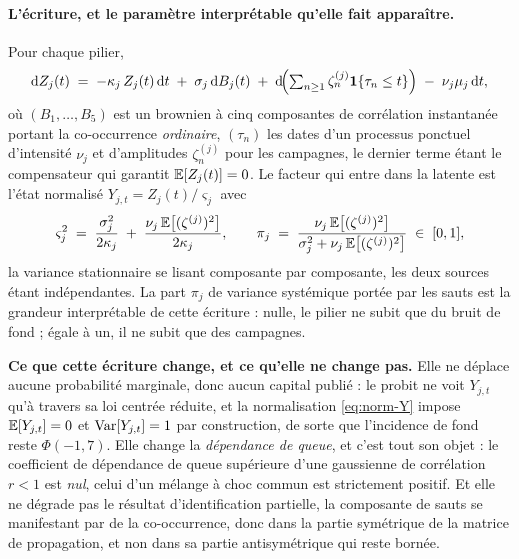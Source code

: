 \paragraph{L'écriture, et le paramètre interprétable qu'elle fait apparaître.}
Pour chaque pilier,
\begin{equation}
  \mathrm{d}Z_j(t) \;=\; -\kappa_j\,Z_j(t)\,\mathrm{d}t \;+\; \sigma_j\,\mathrm{d}B_j(t)
  \;+\; \mathrm{d}\!\Bigl(\textstyle\sum_{n\ge 1}\zeta^{(j)}_n\mathbf 1\{\tau_n\le t\}\Bigr)
  \;-\; \nu_j\mu_j\,\mathrm{d}t,
  \label{eq:sde-Y}
\end{equation}
où $(B_1,\dots,B_5)$ est un brownien à cinq composantes de corrélation instantanée portant la
co-occurrence \emph{ordinaire}, $(\tau_n)$ les dates d'un processus ponctuel d'intensité $\nu_j$
et d'amplitudes $\zeta^{(j)}_n$ pour les campagnes, le dernier terme étant le compensateur qui
garantit $\mathbb{E}[Z_j(t)]=0$. Le facteur qui entre dans la latente est l'état normalisé
$Y_{j,t}=Z_j(t)/\varsigma_j$ avec
\begin{equation}
  \varsigma_j^2 \;=\; \frac{\sigma_j^2}{2\kappa_j} \;+\;
  \frac{\nu_j\,\mathbb{E}\bigl[(\zeta^{(j)})^2\bigr]}{2\kappa_j},
  \qquad
  \pi_j \;=\; \frac{\nu_j\,\mathbb{E}\bigl[(\zeta^{(j)})^2\bigr]}
                   {\sigma_j^2+\nu_j\,\mathbb{E}\bigl[(\zeta^{(j)})^2\bigr]} \;\in\; [0,1],
  \label{eq:norm-Y}
\end{equation}
la variance stationnaire se lisant composante par composante, les deux sources étant
indépendantes. La part $\pi_j$ de variance systémique portée par les sauts est la grandeur
interprétable de cette écriture : nulle, le pilier ne subit que du bruit de fond ; égale à un,
il ne subit que des campagnes.

\begin{cle}
\textbf{Ce que cette écriture change, et ce qu'elle ne change pas.} Elle ne déplace
aucune probabilité marginale, donc aucun capital publié : le probit ne voit
$Y_{j,t}$ qu'à travers sa loi centrée réduite, et la normalisation \eqref{eq:norm-Y} impose
$\mathbb{E}[Y_{j,t}]=0$ et $\mathrm{Var}[Y_{j,t}]=1$ par construction, de sorte que l'incidence de fond reste
$\Phi(-1{,}7)$. Elle change la \emph{dépendance de queue}, et c'est tout son objet : le
coefficient de dépendance de queue supérieure d'une gaussienne de corrélation $r<1$ est
\emph{nul}, celui d'un mélange à choc commun est strictement positif. Et elle ne dégrade pas le
résultat d'identification partielle, la composante de sauts se manifestant par de la
co-occurrence, donc dans la partie symétrique de la matrice de propagation, et non dans sa
partie antisymétrique qui reste bornée.
\end{cle}

